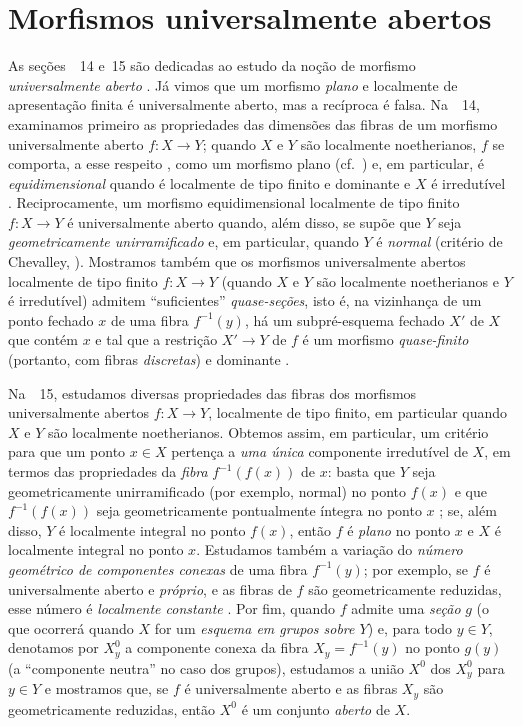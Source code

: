 \section{Morfismos universalmente abertos}
\label{section:IV.14}

As seções~\textsection\textsection~14 e~15 são dedicadas ao estudo da noção de morfismo \emph{universalmente aberto} .
Já vimos  que um morfismo \emph{plano} e localmente de apresentação finita é universalmente aberto, mas a recíproca é falsa.
Na~\textsection~14, examinamos primeiro as propriedades das dimensões das fibras de um morfismo universalmente aberto $f:X\to Y$; quando $X$ e $Y$ são localmente noetherianos, $f$ se comporta, a esse respeito , como um morfismo plano (cf.~) e, em particular, é \emph{equidimensional} quando é localmente de tipo finito e dominante e $X$ é irredutível .
Reciprocamente, um morfismo equidimensional localmente de tipo finito $f:X\to Y$ é universalmente aberto quando, além disso, se supõe que $Y$ seja \emph{geometricamente unirramificado} e, em particular, quando $Y$ é \emph{normal} (critério de Chevalley, ).
Mostramos também que os morfismos universalmente abertos localmente de tipo finito $f:X\to Y$ (quando $X$ e $Y$ são
localmente noetherianos e $Y$ é irredutível) admitem “suficientes” \emph{quase-seções}, isto é, na vizinhança de um ponto fechado $x$ de uma fibra $f^{-1}(y)$, há um subpré-esquema fechado $X'$ de $X$ que contém $x$ e tal que a restrição $X'\to Y$ de $f$ é um morfismo \emph{quase-finito} (portanto, com fibras \emph{discretas}) e dominante .

Na~\textsection~15, estudamos diversas propriedades das fibras dos morfismos universalmente abertos $f:X\to Y$, localmente de tipo finito, em particular quando $X$ e $Y$ são localmente noetherianos.
Obtemos assim, em particular, um critério para que um ponto $x\in X$ pertença a \emph{uma única} componente irredutível de $X$, em termos das propriedades da \emph{fibra} $f^{-1}(f(x))$ de $x$: basta que $Y$ seja geometricamente unirramificado (por exemplo, normal) no ponto $f(x)$ e que $f^{-1}(f(x))$ seja geometricamente pontualmente íntegra no ponto $x$ ; se, além disso, $Y$ é localmente integral no ponto $f(x)$, então $f$ é \emph{plano} no ponto $x$ e $X$ é localmente integral no ponto $x$.
Estudamos também a variação do \emph{número geométrico de componentes conexas} de uma fibra $f^{-1}(y)$; por exemplo, se $f$ é universalmente aberto e \emph{próprio}, e as fibras de $f$ são geometricamente reduzidas, esse número é \emph{localmente constante} .
Por fim, quando $f$ admite uma \emph{seção} $g$ (o que ocorrerá quando $X$ for um \emph{esquema em grupos sobre $Y$}) e, para todo $y\in Y$, denotamos por $X_y^0$ a componente conexa da fibra $X_y=f^{-1}(y)$ no ponto $g(y)$ (a “componente neutra” no caso dos grupos), estudamos a união $X^0$ dos $X_y^0$ para $y\in Y$ e mostramos  que, se $f$ é universalmente aberto e as fibras $X_y$ são geometricamente reduzidas, então $X^0$ é um conjunto \emph{aberto} de $X$.

